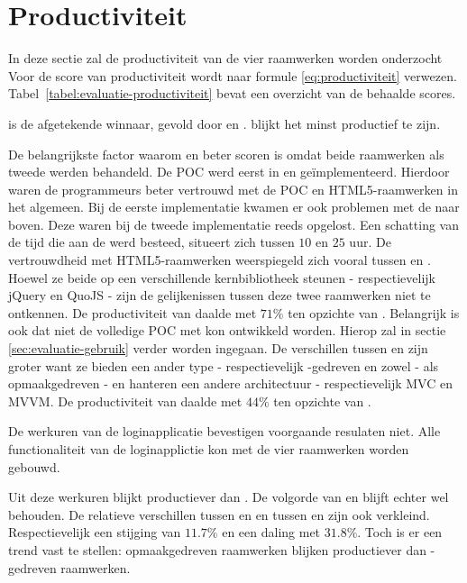 \section{Productiviteit}
\label{sec:evaluatie-productiviteit}

In deze sectie zal de productiviteit van de vier raamwerken worden onderzocht
Voor de score van productiviteit wordt naar formule \ref{eq:productiviteit} verwezen.
Tabel~\ref{tabel:evaluatie-productiviteit} bevat een overzicht van de behaalde scores.

\lungo{} is de afgetekende winnaar,  gevold door \kendo{} en \jqm{}. 
\st{} blijkt het minst productief te zijn.

De belangrijkste factor waarom \lungo{} en \kendo{} beter scoren is omdat beide raamwerken als tweede werden behandeld.
De POC werd eerst in \jqm{} en \st{} geïmplementeerd.
Hierdoor waren de programmeurs beter vertrouwd met de POC en HTML5-raamwerken in het algemeen.
Bij de eerste implementatie kwamen er ook problemen met de  naar boven.
Deze waren bij de tweede implementatie reeds opgelost.
Een schatting van de tijd die aan de  werd besteed, situeert zich tussen $10$ en $25$ uur. %
De vertrouwdheid met HTML5-raamwerken weerspiegeld zich vooral tussen \jqm{} en \lungo{}.
Hoewel ze beide op een verschillende kernbibliotheek steunen - respectievelijk jQuery en QuoJS - zijn de gelijkenissen tussen deze twee raamwerken niet te ontkennen.
De productiviteit van \lungo{} daalde met $71\%$ ten opzichte van \jqm{}.
Belangrijk is ook dat niet de volledige POC met \lungo{} kon ontwikkeld worden.
Hierop zal in sectie \ref{sec:evaluatie-gebruik} verder worden ingegaan.
De verschillen tussen \st{} en \kendo{} zijn groter want ze bieden een ander type - respectievelijk \js-gedreven en zowel \js- als opmaakgedreven - en hanteren een andere architectuur - respectievelijk MVC en MVVM.
De productiviteit van \kendo{} daalde met $44\%$ ten opzichte van \st{}.


De werkuren van de loginapplicatie bevestigen voorgaande resulaten niet.
Alle functionaliteit van de loginapplictie kon met de vier raamwerken worden gebouwd.

Uit deze werkuren blijkt \jqm{} productiever dan \lungo{}. 
De volgorde van \kendo{} en \st{} blijft echter wel behouden.
De relatieve verschillen tussen \jqm{} en \lungo{} en tussen \st{} en \kendo{} zijn ook verkleind.  
Respectievelijk een stijging van $11.7\%$ en een daling met $31.8\%$.
Toch is er een trend vast te stellen:  opmaakgedreven raamwerken blijken productiever dan \js-gedreven raamwerken.

